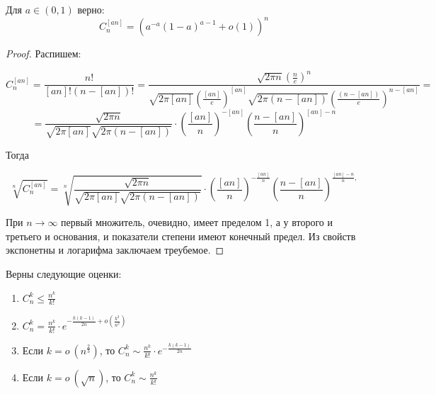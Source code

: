 \begin{theorem}
	Для $a \in \left( 0, 1\right)$ верно:
	\[C_{n}^{[a n]}=\left(a^{-a}(1-a)^{a-1}+o(1)\right)^{n} \]
	
\end{theorem}

\begin{proof}
	Распишем:
	
	
	$$C_{n}^{[a n]}=\frac{n!}{[a n]!(n-[a n])!} =
	\frac{\sqrt{2 \pi n}\left(\frac{n}{e}\right)^{n}}{\sqrt{2 \pi[a n]}\left(\frac{[a n]}{e}\right)^{[a n]} \sqrt{2 \pi(n-[a n])}\left(\frac{(n-[a n])}{e}\right)^{n-[a n]}}= $$
	$$
	= \frac{\sqrt{2 \pi n}}{\sqrt{2 \pi[a n]} \sqrt{2 \pi\left( n-[a n]\right) }} \cdot \left( \frac{[an]}{n}\right) ^{-[an]}\left( \frac{n-[an]}{n}\right) ^{[an]-n}$$
	
	\qquad
	
	Тогда
	
	$$
	\sqrt[n]{C_{n}^{[a n]}}=\sqrt[n]{\frac{\sqrt{2 \pi n}}{\sqrt{2 \pi[a n]} \sqrt{2 \pi\left( n-[a n]\right) }}} \cdot \left( \frac{[an]}{n}\right) ^{-\frac{[an]}{n}}\left( \frac{n-[an]}{n}\right) ^{\frac{[an]-n}{n},}
	$$
	
	При $n \to \infty$ первый множитель, очевидно, имеет пределом 1, а у второго и третьего и основания, и показатели степени имеют конечный предел. Из свойств экспонетны и логарифма заключаем треубемое.
\end{proof}

\begin{theorem}
	Верны следующие оценки:
	\begin{enumerate}
		\item $C_{n}^{k} \leqslant \frac{n^{k}}{k !}$
		\item $C_{n}^{k} = \frac{n^{k}}{k!} \cdot e^{-\frac{k(k-1)}{2n} + o\left(\frac{k^3}{n^2}\right)}$
		\item Если $k = o\:(n^{\frac{2}{3}})$, то $C_{n}^{k} \sim \frac{n^{k}}{k!} \cdot e^{-\frac{k(k-1)}{2n}}$
		\item Если $k = o\:(\sqrt{n})$, то $C_{n}^{k} \sim \frac{n^{k}}{k!}$
	\end{enumerate}
	
\end{theorem}

